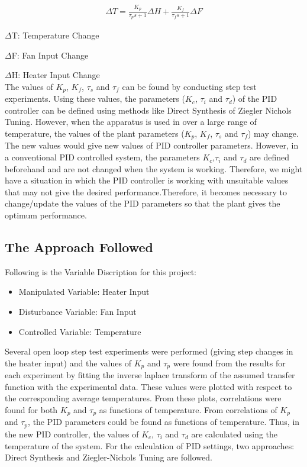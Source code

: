 \begin{align}
\Delta T = \frac {K_p}{\tau_ps+1} \Delta H + \frac {K_f}{\tau_fs+1} \Delta F 
\end{align}
 
$\Delta$T: Temperature Change

$\Delta$F: Fan Input Change

$\Delta$H: Heater Input Change\\

The values of $K_p$, $K_f$, $\tau_s$ and $\tau_f$ can be found by conducting step test experiments. Using these values, the parameters ($K_c$,  $\tau_i$ and  $\tau_d$) of the PID controller can be defined using methods like Direct Synthesis of Ziegler Nichols Tuning.
However, when the apparatus is used in over a large range of temperature, the values of the plant parameters ($K_p$, $K_f$, $\tau_s$ and $\tau_f$) may change. The new values would give new values of PID controller parameters. However, in a conventional PID controlled system, the parameters $K_c$,$\tau_i$ and $\tau_d$ are defined beforehand and are not changed when the system is working. Therefore, we might have a situation in which the PID controller is working with unsuitable values that may not give the desired performance.Therefore, it becomes necessary to change/update the values of the PID parameters so that the plant gives the optimum performance.
\newpage
\subsection{The Approach Followed}
Following is the Variable Discription for this project:
\begin{itemize}
	\item  Manipulated Variable: Heater Input
	\item  Disturbance Variable: Fan Input
	\item  Controlled Variable: Temperature
\end{itemize}

Several open loop step test experiments were performed (giving step changes in the heater input) and the values of $K_p$ and $\tau_p$  were found from the results for each experiment by fitting the inverse laplace transform of the assumed transfer function with the experimental data. These values were plotted with respect to the corresponding average temperatures. From these plots, correlations were found for both $K_p$ and $\tau_p$ as functions of temperature. 
From correlations of  $K_p$ and $\tau_p$, the PID parameters could be found as functions of temperature. Thus, in the new PID controller, the values of $K_c$, $\tau_i$ and $\tau_d$ are calculated using the temperature of the system. For the calculation of PID settings, two approaches: Direct Synthesis and Ziegler-Nichols Tuning are followed.



